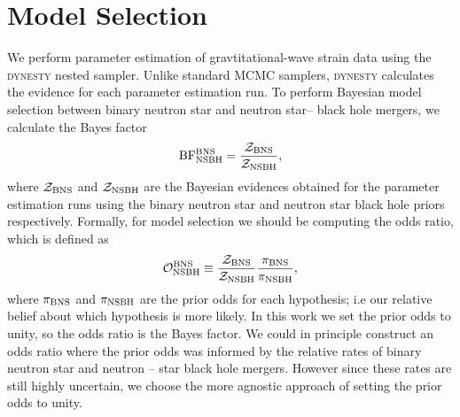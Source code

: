 \documentclass[twocolumn]{aastex631}
\begin{document}
\section{Model Selection}\label{sec:Model Selection}
We perform parameter estimation of gravtitational-wave strain data using the \textsc{dynesty} nested sampler. Unlike standard MCMC samplers,
\textsc{dynesty} calculates the evidence for each parameter estimation run.   
To perform Bayesian model selection between binary neutron star and neutron star-- black hole mergers, we calculate the Bayes factor
\begin{equation}
		\rm BF^{\rm BNS}_{\rm NSBH}  = \frac{\mathcal{Z_{\rm BNS}}}{\mathcal{Z_{\rm NSBH}}},
\end{equation}
where $\mathcal{Z}_{\rm BNS}$ and $\mathcal{Z}_{\rm NSBH}$ are the Bayesian evidences obtained for the parameter estimation runs using the binary neutron star 
and neutron star black hole priors respectively.
Formally, for model selection we should be computing the odds ratio, which is defined as
\begin{equation}
	\mathcal{O}^{\rm BNS}_{\rm NSBH} \equiv \frac{\mathcal{Z_{\rm BNS}}}{\mathcal{Z_{\rm NSBH}}} \frac{\pi_{\rm BNS}}{\pi_{\rm NSBH}},
\end{equation}
where $\pi_{\rm BNS}$ and $\pi_{\rm NSBH}$ are the prior odds for each hypothesis; i.e our relative belief about which hypothesis is more likely. 
In this work we set the prior odds to unity, so the odds ratio is the Bayes factor. 
We could in principle construct an odds ratio where the prior odds was informed by the relative rates of binary neutron star and neutron -- star black hole mergers. 
However since these rates are still highly uncertain, we choose the more agnostic approach of setting the prior odds to unity. 
{}

	
	
\end{document}
